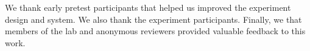 \begin{acks}
We thank early pretest participants that helped us improved the experiment design and system. We also thank the experiment participants. Finally, we that members of the lab and anonymous reviewers provided valuable feedback to this work.
\end{acks}
